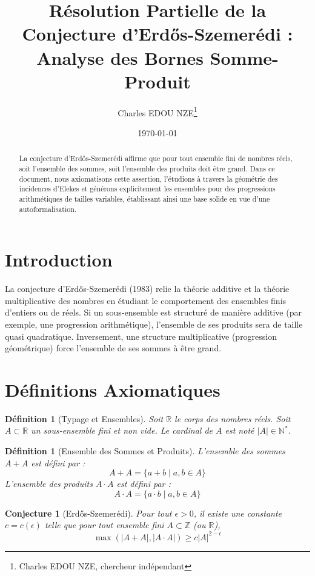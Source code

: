 \documentclass[11pt,a4paper]{article}
\title{Résolution Partielle de la Conjecture d'Erd\H{o}s-Szemerédi : Analyse des Bornes Somme-Produit}
\author{Charles EDOU NZE\thanks{Charles EDOU NZE, chercheur indépendant}}
\date{\today}
\newtheorem{definition}[theorem]{Définition}
\newtheorem{conjecture}[theorem]{Conjecture}
\begin{document}
\maketitle

\begin{abstract}
La conjecture d'Erd\H{o}s-Szemerédi affirme que pour tout ensemble fini de nombres réels, soit l'ensemble des sommes, soit l'ensemble des produits doit être grand. Dans ce document, nous axiomatisons cette assertion, l'étudions à travers la géométrie des incidences d'Elekes et générons explicitement les ensembles pour des progressions arithmétiques de tailles variables, établissant ainsi une base solide en vue d'une autoformalisation.
\end{abstract}

\tableofcontents
\newpage

\section{Introduction}
La conjecture d'Erd\H{o}s-Szemerédi (1983) relie la théorie additive et la théorie multiplicative des nombres en étudiant le comportement des ensembles finis d'entiers ou de réels. Si un sous-ensemble est structuré de manière additive (par exemple, une progression arithmétique), l'ensemble de ses produits sera de taille quasi quadratique. Inversement, une structure multiplicative (progression géométrique) force l'ensemble de ses sommes à être grand.

\section{Définitions Axiomatiques}

\begin{definition}[Typage et Ensembles]
Soit $\mathbb{R}$ le corps des nombres réels.
Soit $A \subset \mathbb{R}$ un sous-ensemble fini et non vide.
Le cardinal de $A$ est noté $|A| \in \mathbb{N}^*$.
\end{definition}

\begin{definition}[Ensemble des Sommes et Produits]
L'ensemble des sommes $A+A$ est défini par :
$$ A+A = \{ a+b \mid a, b \in A \} $$
L'ensemble des produits $A \cdot A$ est défini par :
$$ A \cdot A = \{ a \cdot b \mid a, b \in A \} $$
\end{definition}

\begin{conjecture}[Erd\H{o}s-Szemerédi]
Pour tout $\epsilon > 0$, il existe une constante $c = c(\epsilon)$ telle que pour tout ensemble fini $A \subset \mathbb{Z}$ (ou $\mathbb{R}$),
$$ \max(|A+A|, |A \cdot A|) \ge c |A|^{2 - \epsilon} $$
\end{conjecture}
\end{document}
